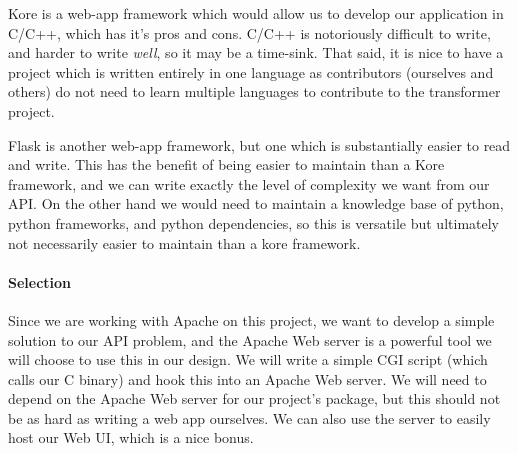 Kore is a web-app framework which would allow us to develop our application in C/C++, which has it's pros and cons.
C/C++ is notoriously difficult to write, and harder to write \textit{well}, so it may be a time-sink.
That said, it is nice to have a project which is written entirely in one language as contributors (ourselves and others) do not need to learn multiple languages to contribute to the transformer project.

Flask is another web-app framework, but one which is substantially easier to read and write.
This has the benefit of being easier to maintain than a Kore framework, and we can write exactly the level of complexity we want from our API.
On the other hand we would need to maintain a knowledge base of python, python frameworks, and python dependencies, so this is versatile but ultimately not necessarily easier to maintain than a kore framework.

\paragraph{Selection}

Since we are working with Apache on this project, we want to develop a simple solution to our API problem, and the Apache Web server is a powerful tool we will choose to use this in our design.
We will write a simple CGI script (which calls our C binary) and hook this into an Apache Web server.
We will need to depend on the Apache Web server for our project's package, but this should not be as hard as writing a web app ourselves.
We can also use the server to easily host our Web UI, which is a nice bonus.
